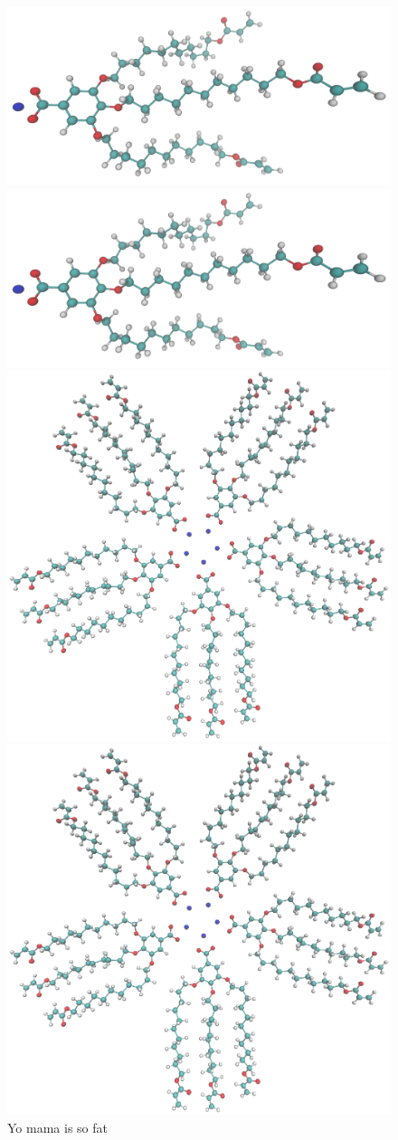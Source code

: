 \documentclass{article}
\begin{document}
\begin{figure}[ht] 
  \begin{minipage}[b]{0.5\linewidth}
    \centering
    \includegraphics[width=.5\linewidth]{monomer.png} 
  \end{minipage}%
  \begin{minipage}[b]{0.5\linewidth}
    \centering
    \includegraphics[width=.5\linewidth]{monomer.png}
  \end{minipage} 
  \begin{minipage}[b]{0.5\linewidth}
    \centering
    \includegraphics[width=.5\linewidth]{layer.png} 
  \end{minipage}%
  \begin{minipage}[b]{0.5\linewidth}
    \centering
    \includegraphics[width=.5\linewidth]{layer.png} 
  \end{minipage} 
  \caption{Yo mama is so fat}
\end{figure}
\end{document}
